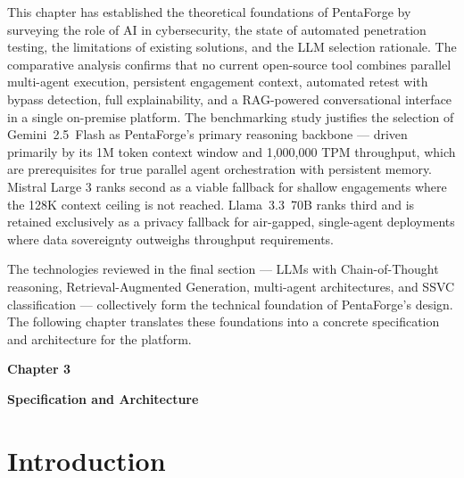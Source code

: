 \documentclass[12pt,a4paper]{report}
\begin{document}
This chapter has established the theoretical foundations of PentaForge by surveying
the role of AI in cybersecurity, the state of automated penetration testing, the
limitations of existing solutions, and the LLM selection rationale. The comparative
analysis confirms that no current open-source tool combines parallel multi-agent
execution, persistent engagement context, automated retest with bypass detection,
full explainability, and a RAG-powered conversational interface in a single
on-premise platform. The benchmarking study justifies the selection of
Gemini~2.5~Flash as PentaForge's primary reasoning backbone --- driven primarily
by its 1M token context window and 1{,}000{,}000 TPM throughput, which are
prerequisites for true parallel agent orchestration with persistent memory.
Mistral Large 3 ranks second as a viable fallback for shallow engagements where
the 128K context ceiling is not reached. Llama~3.3~70B ranks third and is retained
exclusively as a privacy fallback for air-gapped, single-agent deployments where
data sovereignty outweighs throughput requirements.

The technologies reviewed in the final section --- LLMs with Chain-of-Thought
reasoning, Retrieval-Augmented Generation, multi-agent architectures, and SSVC
classification --- collectively form the technical foundation of PentaForge's design.
The following chapter translates these foundations into a concrete specification and
architecture for the platform.

\pagestyle{fancy}
\newpage
\pagestyle{chapterthree}

\vspace*{4cm}

{\fontsize{26}{30}\selectfont \textbf{Chapter 3}}\par

\vspace{1cm}

{\LARGE\bfseries Specification and Architecture}

\vspace{0.8cm}

\setcounter{chapter}{3}
\setcounter{section}{0}

\section*{Introduction}
\end{document}
